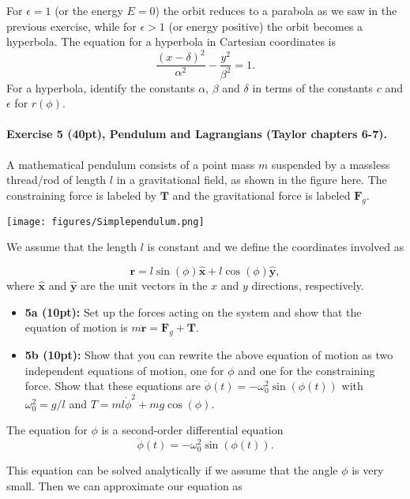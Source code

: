 \documentclass[%
oneside,                 %
final,                   %
10pt]{article}
\begin{document}
For $\epsilon=1$ (or the energy $E=0$) the orbit reduces to a parabola as we saw in the previous exercise,
while for $\epsilon > 1$ (or energy positive) the orbit becomes a hyperbola. The equation for a hyperbola in Cartesian coordinates is
\[
\frac{(x-\delta)^2}{\alpha^2}-\frac{y^2}{\beta^2}=1.
\]
For a hyperbola, identify the constants $\alpha$, $\beta$ and $\delta$ in terms of the constants $c$ and $\epsilon$ for $r(\phi)$. 

\paragraph{Exercise 5 (40pt), Pendulum and Lagrangians (Taylor chapters 6-7).}
A mathematical pendulum consists of a point mass $m$ suspended by a massless thread/rod of length $l$ in a gravitational field, as shown in the figure here. The constraining force is labeled by $\bm{T}$
and the gravitational force is labeled $\bm{F}_g$.

\vspace{6mm}

\centerline{\texttt{[image: figures/Simplependulum.png]}}

\vspace{6mm}

We assume that the length $l$ is constant and we define the coordinates involved as

\[
\bm{r} = l\sin(\phi)\bm{\hat{x}}+l\cos(\phi)\bm{\hat{y}},
\]
where $\bm{\hat{x}}$ and $\bm{\hat{y}}$ are the unit vectors in the $x$ and $y$ directions, respectively.

\begin{itemize}
\item \textbf{5a (10pt):} Set up the forces acting on the system and show that the equation of motion is $m\ddot{\bm{r}}=\bm{F}_g+\bm{T}$.

\item \textbf{5b (10pt):} Show that you can rewrite the above equation of motion as two independent equations of motion, one for $\phi$ and one for the constraining force. Show that these equations are $\ddot{\phi}(t)=-\omega_0^2\sin{(\phi(t))}$ with $\omega_0^2=g/l$ and $T=ml\dot{\phi}^2+mg\cos{(\phi)}$.
\end{itemize}

\noindent
The equation for $\phi$ is a second-order differential equation
\[
\ddot{\phi}(t)=-\omega_0^2\sin{(\phi(t))}.
\]

This equation can be solved analytically if we assume that the angle $\phi$ is very small. Then we can approximate our equation as
\end{document}
